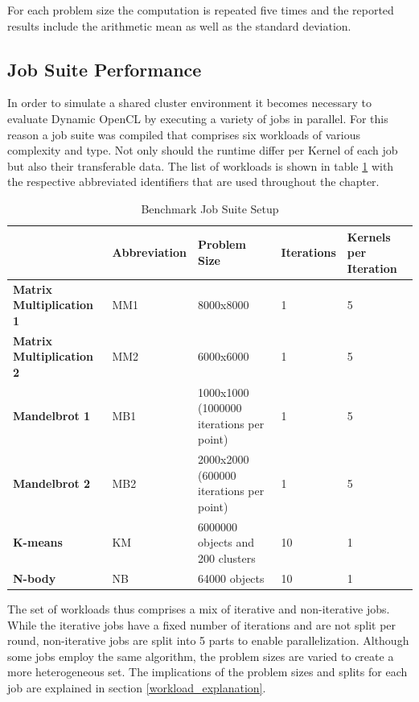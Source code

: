 For each problem size the computation is repeated five times and the reported results include the arithmetic mean as well as the standard deviation. 

\subsection{Job Suite Performance}

In order to simulate a shared cluster environment it becomes necessary to evaluate Dynamic OpenCL by executing a variety of jobs in parallel. For this reason a job suite was compiled that comprises six workloads of various complexity and type. Not only should the runtime differ per Kernel of each job but also their transferable data. The list of workloads is shown in table \ref{table:benchmark_job_setup} with the respective abbreviated identifiers that are used throughout the chapter.

\begin{table}[!htb]
	\centering
	\begin{adjustbox}{width=0.95\textwidth}
		\small
		\begin{tabular}{l | l | l | l | l}
			~ & \textbf{Abbreviation}						& \textbf{Problem Size}		& \textbf{Iterations}	& \textbf{Kernels per Iteration} \\
			\hline
			\textbf{Matrix Multiplication 1}	& MM1  	& 8000x8000  								& 1 	& 5 \\
			\textbf{Matrix Multiplication 2} 	& MM2	& 6000x6000  								& 1		& 5 \\
			\textbf{Mandelbrot 1}     		 	& MB1	& 1000x1000 (1000000 iterations per point) 	& 1		& 5 \\
			\textbf{Mandelbrot 2}				& MB2	& 2000x2000 (600000 iterations per point)  	& 1		& 5 \\
			\textbf{K-means}          			& KM 	& 6000000 objects and 200 clusters  		& 10	& 1 \\
			\textbf{N-body}    		 			& NB 	& 64000 objects  							& 10	& 1 \\		
		\end{tabular}
	\end{adjustbox}
	
	\caption{Benchmark Job Suite Setup}
	\label{table:benchmark_job_setup}
\end{table}

The set of workloads thus comprises a mix of iterative and non-iterative jobs. While the iterative jobs have a fixed number of iterations and are not split per round, non-iterative jobs are split into 5 parts to enable parallelization. Although some jobs employ the same algorithm, the problem sizes are varied to create a more heterogeneous set. The implications of the problem sizes and splits for each job are explained in section \ref{workload_explanation}.

